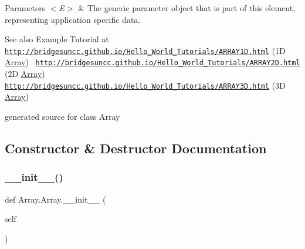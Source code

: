 \begin{DoxyParams}{Parameters}
{\em $<$\+E$>$} & The generic parameter object that is part of this element, representing application specific data.\\
\hline
\end{DoxyParams}
\begin{DoxySeeAlso}{See also}
Example Tutorial at ~\newline
 \href{http://bridgesuncc.github.io/Hello_World_Tutorials/ARRAY1D.html}{\tt http\+://bridgesuncc.\+github.\+io/\+Hello\+\_\+\+World\+\_\+\+Tutorials/\+A\+R\+R\+A\+Y1\+D.\+html} (1D \hyperlink{class_array_1_1_array}{Array})~\newline
 \href{http://bridgesuncc.github.io/Hello_World_Tutorials/ARRAY2D.html}{\tt http\+://bridgesuncc.\+github.\+io/\+Hello\+\_\+\+World\+\_\+\+Tutorials/\+A\+R\+R\+A\+Y2\+D.\+html} (2D \hyperlink{class_array_1_1_array}{Array})~\newline
 \href{http://bridgesuncc.github.io/Hello_World_Tutorials/ARRAY3D.html}{\tt http\+://bridgesuncc.\+github.\+io/\+Hello\+\_\+\+World\+\_\+\+Tutorials/\+A\+R\+R\+A\+Y3\+D.\+html} (3D \hyperlink{class_array_1_1_array}{Array})\begin{DoxyVerb}generated source for class Array \end{DoxyVerb}
 
\end{DoxySeeAlso}


\subsection{Constructor \& Destructor Documentation}
\hypertarget{class_array_1_1_array_a3f63c2cb80dd28142f7c04dbe47a03fa}{}\label{class_array_1_1_array_a3f63c2cb80dd28142f7c04dbe47a03fa} 
\subsubsection{\texorpdfstring{\+\_\+\+\_\+init\+\_\+\+\_\+()}{\_\_init\_\_()}}
{\footnotesize\ttfamily def Array.\+Array.\+\_\+\+\_\+init\+\_\+\+\_\+ (\begin{DoxyParamCaption}\item[{}]{self }\end{DoxyParamCaption})}



